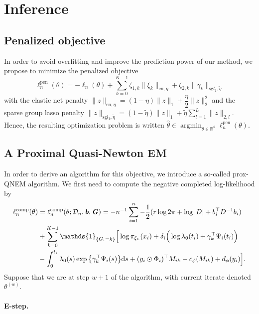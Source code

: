 \documentclass[11pt]{article}
\DeclareMathOperator{\argmin}{argmin}
\newcommand{\dd}{\mathrm{d}}
\newcommand{\ind}[1]{\mathds{1}_{#1}}
\newcommand{\norm}[1]{\|#1\|}
\newcommand{\cD}{\mathcal D}
\newcommand{\R}{\mathds R}
\begin{document}
\section{Inference}
\label{sec:inference}

\subsection{Penalized objective}
\label{sec:penalized-obj}

In order to avoid overfitting and improve the prediction power of our method, we propose to minimize the penalized objective
\begin{equation*}
    \ell_n^\text{pen}(\theta) = - \ell_n(\theta) + \sum_{k=0}^{K-1} \zeta_{1,k} \norm{\xi_k}_{\text{en}, \eta} + \zeta_{2,k} \norm{\gamma_k}_{\text{sg} l_1, \tilde{\eta}}
\end{equation*}
with the elastic net penalty $\norm{z}_{\text{en}, \eta} = (1-\eta)\norm{z}_1 + \dfrac\eta2 \norm{z}_2^2$ and the sparse group lasso penalty $\norm{z}_{\text{sg} l_1, \tilde{\eta}} = (1-\tilde{\eta})\norm{z}_1 + \tilde{\eta} \sum_{l=1}^L\norm{z}_{2,l}$.
Hence, the resulting optimization problem is written $\hat \theta \in \argmin_{\theta \in \R^\vartheta} \ell_n^\text{pen}(\theta).$

\subsection{A Proximal Quasi-Newton EM}
\label{sec:prox-QNEM}

In order to derive an algorithm for this objective, we introduce a so-called prox-QNEM algorithm. We first need to compute the negative completed log-likelihood by
\begin{align*}
  \ell_n^\text{comp}(\theta) &= \ell_n^\text{comp}(\theta ; \cD_n, \textbf{\textit{b}}, \textbf{\textit{G}}) = - n^{-1} \sum_{i=1}^n -\dfrac12 (r \log 2\pi + \log|D| + b_i^\top D^{-1}b_i) \\ 
  &+ \sum_{k=0}^{K-1} \ind{\{G_i=k\}} \Big[ \log \pi_{\xi_k}(x_i) + \delta_i \Big(\log \lambda_0(t_i) + \gamma_k^\top \Psi_i(t_i) \Big) \\ 
  &- \int_0^{t_i} \lambda_0(s) \exp \big\{ \gamma_k^\top \Psi_i(s) \big\} \dd s  + (y_i \odot \Phi_i)^\top M_{ik} - c_\phi(M_{ik}) + d_\phi(y_i) \Big].
\end{align*}
Suppose that we are at step $w + 1$ of the algorithm, with current iterate denoted $\theta^{(w)}$. 

\paragraph*{E-step.}
\end{document}
